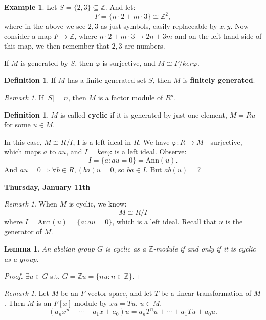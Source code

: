 \documentclass[12pt]{amsbook}
\theoremstyle{plain}
\numberwithin{section}{chapter}
\numberwithin{equation}{chapter}
\newtheorem{lem}[theorem]{Lemma}
\theoremstyle{definition}
\newtheorem{Def}[theorem]{Definition}
\newtheorem{Ex}[theorem]{Example}
\theoremstyle{remark}
\newtheorem{rem}[theorem]{Remark}
\newcommand{\sub}{\subseteq}
\newcommand{\z}{\mathbb{Z}}
\renewcommand{\phi}{\varphi}
\begin{document}
\begin{Ex}
Let $S = \{2,3\} \sub \z$. And let:
$$
F = \{n\cdot 2 + m \cdot 3\} \cong \z^2,
$$
where in the above we see $2,3$ as just symbols, easily replaceable by $x,y$. Now consider a map $F \to \z$, where $n\cdot 2 + m \cdot 3 \to 2n + 3m$ and on the left hand side of this map, we then remember that $2,3$ are numbers. 
\end{Ex}




If $M$ is generated by $S$, then $\phi$ is surjective, and $M \cong F/ker\phi$. 

\begin{Def}
If $M$ has a finite generated set $S$, then $M$ is \textbf{finitely generated}. 
\end{Def}

\begin{rem}
If $|S| = n$, then $M$ is a factor module of $R^n$. 
\end{rem}

\begin{Def}
$M$ is called \textbf{cyclic} if it is generated by just one element, $M = Ru$ for some $u \in M$. 
\end{Def}
In this case, $M \cong R/I$, I is a left ideal in $R$. We have $\phi:R \to M$ - surjective, which maps $a$ to $au$, and $I = ker\phi$ is a left ideal. Observe: 
$$
I = \{a: au = 0\} = \text{Ann}(u). 
$$
And $au = 0 \Rightarrow \forall b \in R, (ba)u = 0$, so $ba \in I$. But $ab(u) = ?$

\textbf{Thursday, January 11th}

\begin{rem}
When $M$ is cyclic, we know:
$$
M \cong R/I
$$
where $I = \text{Ann}(u) = \{a:au = 0\}$, which is a left ideal. Recall that $u$ is the generator of $M$. 
\end{rem}

\begin{lem}
An abelian group $G$ is cyclic as a $\z$-module if and only if it is cyclic as a group. 
\end{lem}
\begin{proof}
$\exists u \in G$ s.t. $G = \z u = \{nu:n \in \z\}$. 
\end{proof}

\begin{rem}
Let $M$ be an $F$-vector space, and let $T$ be a linear transformation of $M$. Then $M$ is an $F[x]$-module by $xu = Tu$, $u \in M$. 
$$
(a_nx^n + \cdots + a_1x + a_0)u = a_nT^nu + \cdots + a_1Tu + a_0u.
$$
\end{rem}
\end{document}
